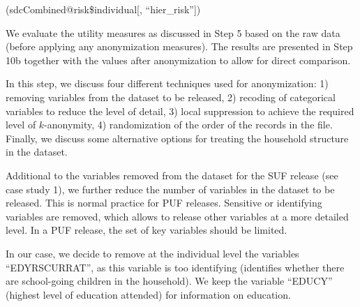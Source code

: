 \documentclass[letterpaper,10pt,english]{sphinxmanual}
\begin{document}

\begin{DUlineblock}{0em}
\item[] 
\item[] (sdcCombined@risk\$individual{[}, “hier\_risk”{]})
\end{DUlineblock}



We evaluate the utility measures as discussed in Step 5 based on the raw
data (before applying any anonymization measures). The results are
presented in Step 10b together with the values after anonymization to
allow for direct comparison.


In this step, we discuss four different techniques used for
anonymization: 1) removing variables from the dataset to be released, 2)
recoding of categorical variables to reduce the level of detail, 3)
local suppression to achieve the required level of \(k\)-anonymity,
4) randomization of the order of the records in the file. Finally, we
discuss some alternative options for treating the household structure in
the dataset.


Additional to the variables removed from the dataset for the SUF release
(see case study 1), we further reduce the number of variables in the
dataset to be released. This is normal practice for PUF releases.
Sensitive or identifying variables are removed, which allows to release
other variables at a more detailed level. In a PUF release, the set of
key variables should be limited.

In our case, we decide to remove at the individual level the variables
“EDYRSCURRAT”, as this variable is too identifying (identifies whether
there are school-going children in the household). We keep the variable
“EDUCY” (highest level of education attended) for information on
education. 
\end{document}

